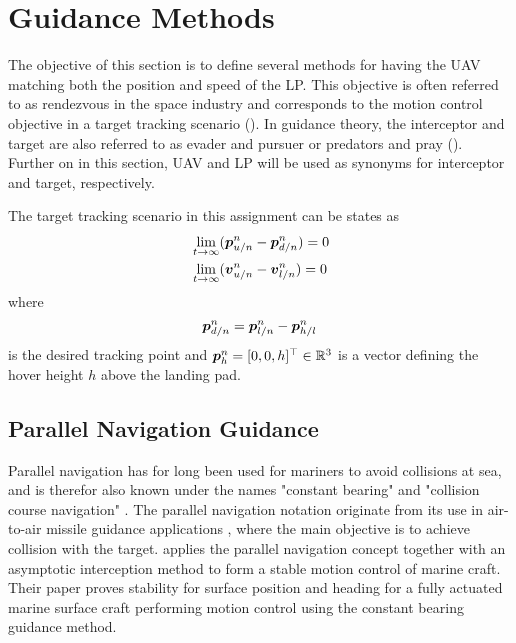
\section{Guidance Methods} %
\label{sec:guidance_methods}

The objective of this section is to define several methods for having the UAV matching both the position and speed of the LP. This objective is often referred to as rendezvous in the space industry and corresponds to the motion control objective in a target tracking scenario (\cite{breivik2010topics}). 
In guidance theory, the interceptor and target are also referred to as evader and pursuer or predators and pray (\cite{Shneydor1998xiii}). Further on in this section, UAV and LP will be used as synonyms for interceptor and target, respectively.

The target tracking scenario in this assignment can be states as
\begin{align}
	&\lim_{t\to\infty}(\boldsymbol{p}^{n}_{u/n}-\boldsymbol{p}_{d/n}^{n})=0\\
	&\lim_{t\to\infty}(\boldsymbol{v}^{n}_{u/n}-\boldsymbol{v}^{n}_{l/n})=0
\end{align}
where
\begin{equation}
	\boldsymbol{p}_{d/n}^{n}=\boldsymbol{p}^{n}_{l/n}-\boldsymbol{p}_{h/l}^{n}
\end{equation}
is the desired tracking point and $\boldsymbol{p}_{h}^{n} =[0,0,h]^{\top} \in\mathbb{R}^{3}$ is a vector defining the hover height $h$ above the landing pad.


\subsection{Parallel Navigation Guidance} %
\label{sub:parallel_navigation_guidance}

Parallel navigation has for long been used for mariners to avoid collisions at sea, and is therefor also known under the names "constant bearing" and "collision course navigation" \citep{Shneydor199877}. 
The parallel navigation notation originate from its use in air-to-air missile guidance applications \citep{Fossen2011}, where the main objective is to achieve collision with the target. \cite{breivik2010topics} applies the parallel navigation concept together with an asymptotic interception method to form a stable motion control of marine craft. Their paper proves stability for surface position and heading for a fully actuated marine surface craft performing motion control using the constant bearing guidance method.

